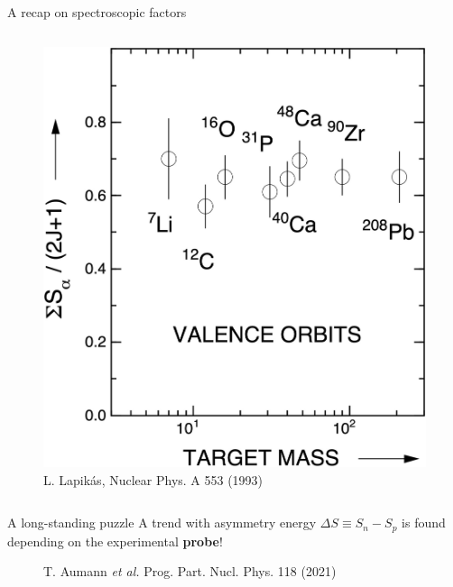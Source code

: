 \documentclass[aspectratio=43, dvipsnames]{beamer}
\begin{document}
\begin{frame}{A recap on spectroscopic factors}
\begin{columns}[T]
\begin{column}{0.48\linewidth}
\begin{figure}
                \includegraphics[width=0.725\linewidth]{figures/lapikas_review.jpg}
                \caption{L. Lapikás, Nuclear Phys. A 553 (1993)}
            \end{figure}
        \end{column}
    \end{columns}
\end{frame}

\begin{frame}{A long-standing puzzle}
    A trend with asymmetry energy $\Delta S \equiv S_{n} - S_{p}$ is found depending on the experimental \textbf{probe}!
    \begin{figure}
        \caption{T. Aumann \textit{et al.} Prog. Part. Nucl. Phys. 118 (2021)}
    \end{figure}
\end{frame}
\end{document}
